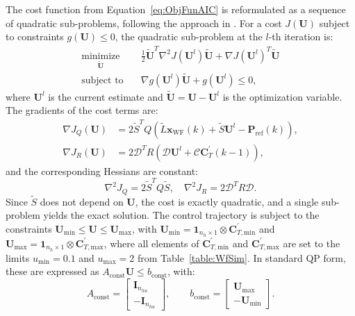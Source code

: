 The cost function from Equation~\eqref{eq:ObjFunAIC} is reformulated as a sequence of quadratic sub-problems, following the approach in \cite{gonzalez2020nonlinear}. For a cost $J(\bm{U})$ subject to constraints $g(\bm{U}) \leq 0$, the quadratic sub-problem at the $l$-th iteration is:
\begin{equation} \label{eq:ObjFunAICapprox}
    \begin{aligned}
        \underset{ \tilde{\bm{U}}} {\text{minimize}} \quad & \frac{1}{2}\tilde{\bm{U}}^T \nabla^2 J(\bm{U}^l) \tilde{\bm{U}} + \nabla J(\bm{U}^l)^T \tilde{\bm{U}} \\
        \text{subject to} \quad & \nabla g(\bm{U}^l) \tilde{\bm{U}} + g(\bm{U}^l) \leq 0,
    \end{aligned}
\end{equation}
where $\bm{U}^l$ is the current estimate and $\tilde{\bm{U}} = \bm{U} - \bm{U}^l$ is the optimization variable. The gradients of the cost terms are:
\begin{align*}
    \nabla J_Q (\bm{U}) &= 2 \tilde{S}^T Q \left( \tilde{L} \bm{x}_{\text{WF}}(k) + \tilde{S} \bm{U}^l - \bm{P}_{\text{ref}}(k) \right), \\
    \nabla J_R(\bm{U}) &= 2 \bm{\mathcal{D}}^T R \left(\bm{\mathcal{D}} \bm{U}^l + \bm{\mathcal{C}} \bm{C}_T^\prime(k-1)\right),
\end{align*}
and the corresponding Hessians are constant:
\begin{equation*}
    \nabla^2 J_Q = 2 \tilde{S}^T Q \tilde{S}, \quad \nabla^2 J_R = 2 \bm{\mathcal{D}}^T R \bm{\mathcal{D}}.
\end{equation*}
Since $\tilde{S}$ does not depend on $\bm{U}$, the cost is exactly quadratic, and a single sub-problem yields the exact solution.
%
The control trajectory is subject to the constraints $\bm{U}_{\min} \leq \bm{U} \leq \bm{U}_{\max}$, with $\bm{U}_{\min} = \bm{1}_{n_h \times 1} \otimes \bm{C}_{T,\text{min}}^\prime$ and $\bm{U}_{\max} = \bm{1}_{n_h \times 1} \otimes \bm{C}_{T,\text{max}}^\prime$, where all elements of $\bm{C}_{T,\text{min}}^\prime$ and $\bm{C}_{T,\text{max}}^\prime$ are set to the limits $u_{\min} = 0.1$ and $u_{\max} = 2$ from Table~\ref{table:WfSim}. In standard QP form, these are expressed as $A_{\text{const}} \bm{U} \leq b_{\text{const}}$, with:
\[
A_{\text{const}} = \begin{bmatrix} \bm{I}_{n_{hu}} \\ -\bm{I}_{n_{hu}} \end{bmatrix}, \qquad b_{\text{const}} = \begin{bmatrix} \bm{U}_{\max} \\ -\bm{U}_{\min} \end{bmatrix}.
\]
